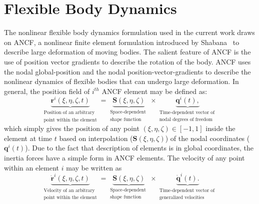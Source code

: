 \section{Flexible Body Dynamics}\label{sec:FMBD}
The nonlinear flexible body dynamics formulation used in the current work draws on ANCF, a nonlinear finite element formulation introduced by Shabana~\cite{Shabana1997} to describe large deformation of moving bodies. The salient feature of ANCF is the use of position vector gradients to describe the rotation of the body. ANCF uses the nodal global-position and the nodal position-vector-gradients to describe the nonlinear dynamics of flexible bodies that can undergo large deformation.
In general, the position field of $i^{th}$ ANCF element may be defined as: 
\begin{equation} \label{eq:ANCF_r}
\underbrace{{{\bm{r}}^{i}}(\xi,\eta,\zeta,t)}_{\begin{smallmatrix}
	\text{Position of an arbitrary } \\
	\text{point within the element}
	\end{smallmatrix}}=\underbrace{\bm{S}(\xi,\eta,\zeta)}_{\begin{smallmatrix}
	\text{Space-dependent } \\
	\text{shape function}
	\end{smallmatrix}}\times \underbrace{{{\bm{q}}^{i}}(t),}_{\begin{smallmatrix}
	\text{Time-dependent vector of } \\
	\text{nodal degrees of freedom}
	\end{smallmatrix}}
\end{equation}
which simply gives the position of any point $(\xi,\eta,\zeta) \in [-1,1]$ inside the element at time $t$ based on interpolation ($\bm{S} (\xi,\eta,\zeta) $) of the nodal coordinates ($\bm{q}^{i}(t)$). Due to the fact that description of elements is in global coordinates, the inertia forces have a simple form in ANCF elements. The velocity of any point within an element $i$ may be written as
\begin{equation} \label{eq:ANCF_r_dot}
\underbrace{\bm{\dot{r}}^{i}(\xi,\eta,\zeta,t)}_{\begin{smallmatrix}
	\text{Velocity of an arbitrary } \\
	\text{point within the element}
	\end{smallmatrix}}=\underbrace{\bm{S}(\xi,\eta,\zeta)}_{\begin{smallmatrix}
	\text{Space-dependent } \\
	\text{shape function}
	\end{smallmatrix}}\times \underbrace{\bm{\dot{q}}^{i}(t).}_{\begin{smallmatrix}
	\text{Time-dependent vector of } \\
	\text{generalized velocities}
	\end{smallmatrix}}
\end{equation}
